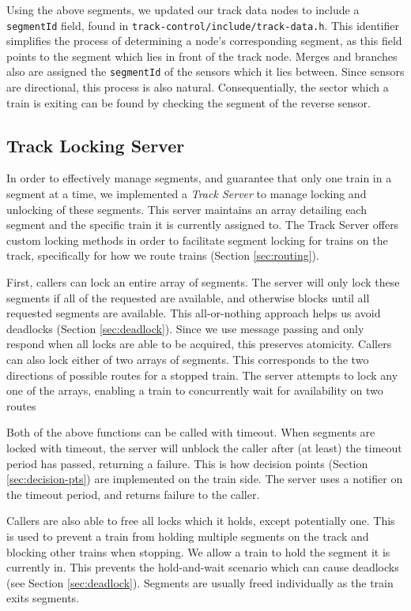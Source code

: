 \documentclass[12pt, titlepage]{article}
\begin{document}
    Using the above segments, we updated our track data nodes to include a \verb`segmentId` field, found in \verb`track-control/include/track-data.h`. This identifier simplifies the process of determining a node's corresponding segment, as this field points to the segment which lies in front of the track node. Merges and branches also are assigned the \verb`segmentId` of the sensors which it lies between. Since sensors are directional, this process is also natural. Consequentially, the sector which a train is exiting can be found by checking the segment of the reverse sensor.

    \subsection{Track Locking Server}
    
    In order to effectively manage segments, and guarantee that only one train in a segment at a time, we implemented a \emph{Track Server} to manage locking and unlocking of these segments. This server maintains an array detailing each segment and the specific train it is currently assigned to. The Track Server offers custom locking methods in order to facilitate segment locking for trains on the track, specifically for how we route trains (Section \ref{sec:routing}).
    
    First, callers can lock an entire array of segments. The server will only lock these segments if all of the requested are available, and otherwise blocks until all requested segments are available. This all-or-nothing approach helps us avoid deadlocks (Section \ref{sec:deadlock}). Since we use message passing and only respond when all locks are able to be acquired, this preserves atomicity.
    Callers can also lock either of two arrays of segments. This corresponds to the two directions of possible routes for a stopped train. The server attempts to lock any one of the arrays, enabling a train to concurrently wait for availability on two routes
    
    Both of the above functions can be called with timeout. When segments are locked with timeout, the server will unblock the caller after (at least) the timeout period has passed, returning a failure. This is how decision points (Section \ref{sec:decision-pts}) are implemented on the train side. The server uses a notifier on the timeout period, and returns failure to the caller.
    
    Callers are also able to free all locks which it holds, except potentially one. This is used to prevent a train from holding multiple segments on the track and blocking other trains when stopping. We allow a train to hold the segment it is currently in. This prevents the hold-and-wait scenario which can cause deadlocks (see Section \ref{sec:deadlock}). Segments are usually freed individually as the train exits segments.
    
\end{document}
